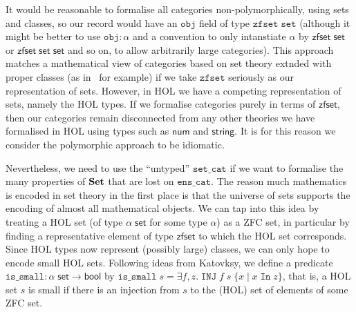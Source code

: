 \documentclass[twoside,titlepage,11pt]{article}
\begin{document}
It would be reasonable to formalise all categories non-polymorphically, using sets and classes, so our record would have an $\mathtt{obj}$ field of type $\mathtt{zfset}\;\mathtt{set}$ (although it might be better to use $\mathtt{obj}:\alpha$ and a convention to only intanstiate $\alpha$ by $\mathsf{zfset}\;\mathsf{set}$ or $\mathsf{zfset}\;\mathsf{set}\;\mathsf{set}$ and so on, to allow arbitrarily large categories).
This approach matches a mathematical view of categories based on set theory extnded with proper classes (as in~\cite{MacLaneCFTWM} for example) if we take $\mathtt{zfset}$ seriously as our representation of sets.
However, in HOL we have a competing representation of sets, namely the HOL types.
If we formalise categories purely in terms of $\mathsf{zfset}$, then our categories remain disconnected from any other theories we have formalised in HOL using types such as $\mathsf{num}$ and $\mathsf{string}$.
It is for this reason we consider the polymorphic approach to be idiomatic.

Nevertheless, we need to use the ``untyped'' $\mathtt{set\_cat}$ if we want to formalise the many properties of $\mathbf{Set}$ that are lost on $\mathtt{ens\_cat}$.
The reason much mathematics is encoded in set theory in the first place is that the universe of sets supports the encoding of almost all mathematical objects.
We can tap into this idea by treating a HOL set (of type $\alpha\;\mathsf{set}$ for some type $\alpha$) as a ZFC set, in particular by finding a representative element of type $\mathsf{zfset}$ to which the HOL set corresponds.
Since HOL types now represent (possibly large) classes, we can only hope to encode small HOL sets.
Following ideas from Katovksy, we define a predicate $\mathtt{is\_small}:\alpha\;\mathsf{set}\to\mathsf{bool}$ by $\mathtt{is\_small}\;s=\exists{f,z}.\;\mathtt{INJ}\;f\;s\;\{x\mid x\operatorname{\mathtt{In}} z\}$, that is, a HOL set $s$ is small if there is an injection from $s$ to the (HOL) set of elements of some ZFC set.
\end{document}
